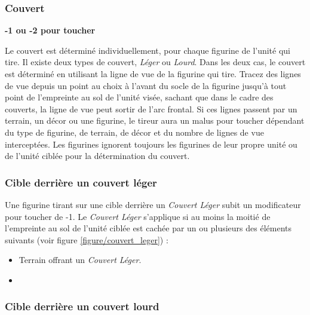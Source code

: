 \subsubsection*{Couvert}

\textbf{-1 ou -2 pour toucher}

Le couvert est déterminé individuellement, pour chaque figurine de l'unité qui tire. Il existe deux types de couvert, \emph{Léger} ou \emph{Lourd}. Dans les deux cas, le couvert est déterminé en utilisant la ligne de vue de la figurine qui tire. Tracez des lignes de vue depuis un point au choix à l'avant du socle de la figurine jusqu'à tout point de l'empreinte au sol de l'unité visée, sachant que dans le cadre des couverts, la ligne de vue peut sortir de l'arc frontal. Si ces lignes passent par un terrain, un décor ou une figurine, le tireur aura un malus pour toucher dépendant du type de figurine, de terrain, de décor et du nombre de lignes de vue interceptées. Les figurines ignorent toujours les figurines de leur propre unité ou de l'unité ciblée pour la détermination du couvert.

\subsubsection*{Cible derrière un couvert léger}

Une figurine tirant sur une cible derrière un \emph{Couvert Léger} subit un modificateur pour toucher de -1. Le \emph{Couvert Léger} s'applique si au moins la moitié de l'empreinte au sol de l'unité ciblée est cachée par un ou plusieurs des éléments suivants (voir figure \ref{figure/couvert_leger}) :
\begin{itemize}[label={-}]
\item Terrain offrant un \emph{Couvert Léger}.
\item {}
\end{itemize}

\subsubsection*{Cible derrière un couvert lourd}

